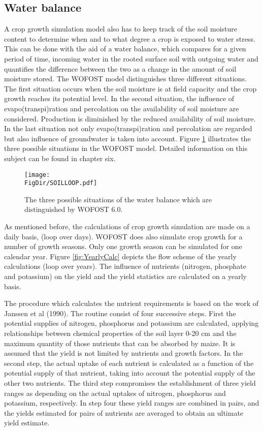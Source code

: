 \subsection{Water balance}
A crop growth simulation model also has to keep track of the soil moisture content to
deter\-mine when and to what degree a crop is exposed to water stress. This can be done
with the aid of a water balance, which com\-pares for a given period of time, incoming
water in the rooted surface soil with outgoing water and quantifies the difference between
the two as a change in the amount of soil moisture stored. The WOFOST model distin\-guishes 
three different situations. The first situation occurs when the soil moisture is at
field capacity and the crop growth reaches its potential level. In the second situation, the
influence of evapo(transpi)rati\-on and percolation on the availability of soil moisture are
considered. Production is dimin\-ished by the reduced availability of soil moisture. In the
last situation not only evapo(transpi)ration and percola\-tion are regarded but also influence
of groundwater is taken into account. Figure \ref{fig:waterbalances} illustrates the 
three possible situations in
the WOFOST model. Detailed information on this subject can be found in chapter six.

\begin{figure}[htbp]
\centering
\texttt{[image: \\FigDir/SOILLOOP.pdf]}
\caption{The three possible situations of the water balance which are distin\-guished
by WOFOST 6.0.}
\label{fig:waterbalances}
\end{figure}

As mentioned before, the calculations of crop growth simulation are made on a daily
basis, (loop over days). WOFOST does also simulate crop growth for a number of growth
seasons. Only one growth season can be simulated for one cal\-endar year. Figure \ref{fig:YearlyCalc}
depicts the flow scheme of the yearly calculations (loop over years). The influ\-ence of
nutrients (nitrogen, phos\-phate and potassi\-um) on the yield and the yield statistics are
calculated on a yearly basis.

The procedure which calculates the nutrient requirements is based on the work of Janssen
et al (1990). The routine consist of four successive steps. First the potential supplies of
nitrogen, phosphorus and potassium are calculated, applying relationships between
chemical properties of the soil layer 0-20 cm and the maximum quantity of those nutrients
that can be absorbed by maize. It is assumed that the yield is not limited by nutrients and
growth factors. In the second step, the actual uptake of each nutrient is calculated as a
function of the potential supply of that nutrient, taking into account the potential supply of
the other two nutrients. The third step compromises the establishment of three yield
ranges as depending on the actual uptakes of nitrogen, phosphorus and potassium,
respectively. In step four these yield ranges are combined in pairs, and the yields
estimated for pairs of nutrients are averaged to obtain an ultimate yield estimate.

